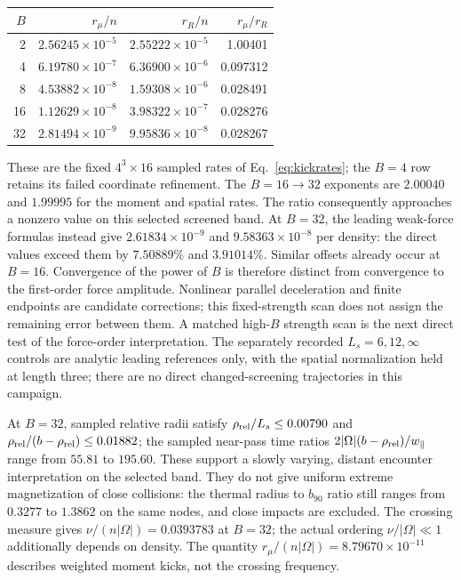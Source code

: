 \documentclass[11pt,letterpaper]{article}
\begin{document}
\begin{center}
\begin{tabular}{rrrr}
\toprule
$B$ & $r_\mu/n$ & $r_R/n$ & $r_\mu/r_R$\\
\midrule
2 & $2.56245\times10^{-5}$ & $2.55222\times10^{-5}$ & 1.00401\\
4 & $6.19780\times10^{-7}$ & $6.36900\times10^{-6}$ & 0.097312\\
8 & $4.53882\times10^{-8}$ & $1.59308\times10^{-6}$ & 0.028491\\
16 & $1.12629\times10^{-8}$ & $3.98322\times10^{-7}$ & 0.028276\\
32 & $2.81494\times10^{-9}$ & $9.95836\times10^{-8}$ & 0.028267\\
\bottomrule
\end{tabular}
\end{center}
These are the fixed $4^3\times16$ sampled rates of
Eq.~\eqref{eq:kickrates}; the $B=4$ row retains its failed coordinate
refinement. The $B=16\to32$ exponents are $2.00040$ and $1.99995$
for the moment and spatial rates. The ratio consequently approaches a
nonzero value on this selected screened band. At $B=32$, the leading
weak-force formulas instead give $2.61834\times10^{-9}$ and
$9.58363\times10^{-8}$ per density: the direct values exceed them by
$7.50889\%$ and $3.91014\%$. Similar offsets already occur at $B=16$.
Convergence of the power of $B$ is therefore distinct from convergence
to the first-order force amplitude. Nonlinear parallel deceleration and
finite endpoints are candidate corrections; this fixed-strength scan
does not assign the remaining error between them. A matched high-$B$
strength scan is the next direct test of the force-order interpretation.
The separately recorded $L_s=6,12,\infty$ controls are analytic leading
references only, with the spatial normalization held at length three;
there are no direct changed-screening trajectories in this campaign.

At $B=32$, sampled relative radii satisfy $\rho_{\rm rel}/L_s\le0.00790$
and $\rho_{\rm rel}/(b-\rho_{\rm rel})\le0.01882$; the sampled near-pass
time ratios $2|\Omega|(b-\rho_{\rm rel})/w_\parallel$ range from
$55.81$ to $195.60$. These support a slowly varying, distant encounter
interpretation on the selected band. They do not give uniform extreme
magnetization of close collisions: the thermal radius to $b_{90}$ ratio
still ranges from $0.3277$ to $1.3862$ on the same nodes, and close
impacts are excluded. The crossing measure gives
$\nu/(n|\Omega|)=0.0393783$ at $B=32$; the actual ordering
$\nu/|\Omega|\ll1$ additionally depends on density. The quantity
$r_\mu/(n|\Omega|)=8.79670\times10^{-11}$ describes weighted moment
kicks, not the crossing frequency.
\end{document}
